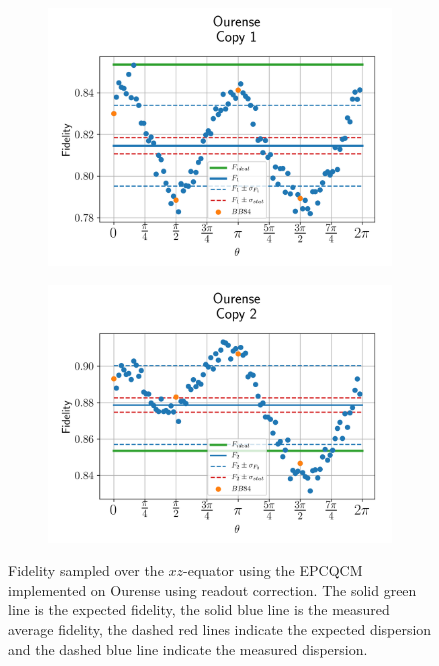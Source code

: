 \begin{figure}[H]
  \centering
  \begin{subfigure}{.5\textwidth}
    \centering
    \includegraphics[width=\textwidth]{Figures/Economical/IBM/OnlyEquator/results_corrected_ourense_copy1.png}
    \label{fig:epc_corrected_ourense_equator_1}
  \end{subfigure}%
  \begin{subfigure}{.5\textwidth}
    \centering
    \includegraphics[width=\textwidth]{Figures/Economical/IBM/OnlyEquator/results_corrected_ourense_copy2.png}
    \label{fig:epc_corrected_ourense_equator_2}
  \end{subfigure}
  \vspace{-0.5cm}
  \caption{Fidelity sampled over the $xz$-equator using the EPCQCM implemented on Ourense using readout correction. The solid green line is the expected fidelity, the solid blue line is the measured average fidelity, the dashed red lines indicate the expected dispersion and the dashed blue line indicate the measured dispersion.}
  \label{fig:epc_corrected_ourense_equator}
\end{figure}

